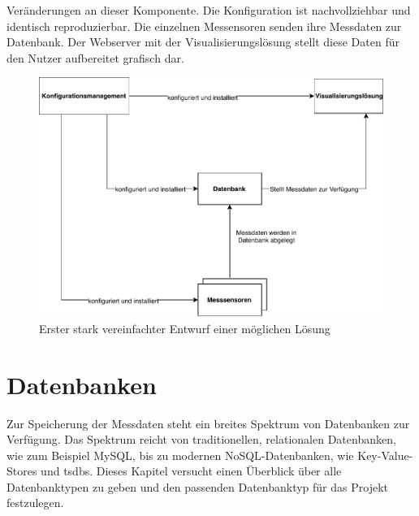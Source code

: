 \documentclass[titlepage]{report}
\begin{document}
Veränderungen an dieser Komponente. Die Konfiguration ist
nachvollziehbar und identisch reproduzierbar.
Die einzelnen Messensoren senden ihre Messdaten zur Datenbank. Der
Webserver mit der Visualisierungslösung stellt diese Daten für den Nutzer aufbereitet
 grafisch dar.
\begin{figure}[H]
    \centering
    \includegraphics[width=1.0\textwidth]{figures/solution.pdf}
    \caption{Erster stark vereinfachter Entwurf einer möglichen Lösung}\label{fig:solution}
\end{figure}
\section{Datenbanken}
Zur Speicherung der Messdaten steht ein breites Spektrum von Datenbanken
zur Verfügung. Das Spektrum reicht von traditionellen, relationalen
Datenbanken, wie zum Beispiel MySQL, bis zu modernen
NoSQL\hyp{}Datenbanken, wie Key\hyp{}Value\hyp{}Stores und \glspl{tsdb}.
Dieses Kapitel versucht einen Überblick über alle Datenbanktypen zu
geben und den passenden Datenbanktyp für das Projekt festzulegen.
\end{document}

